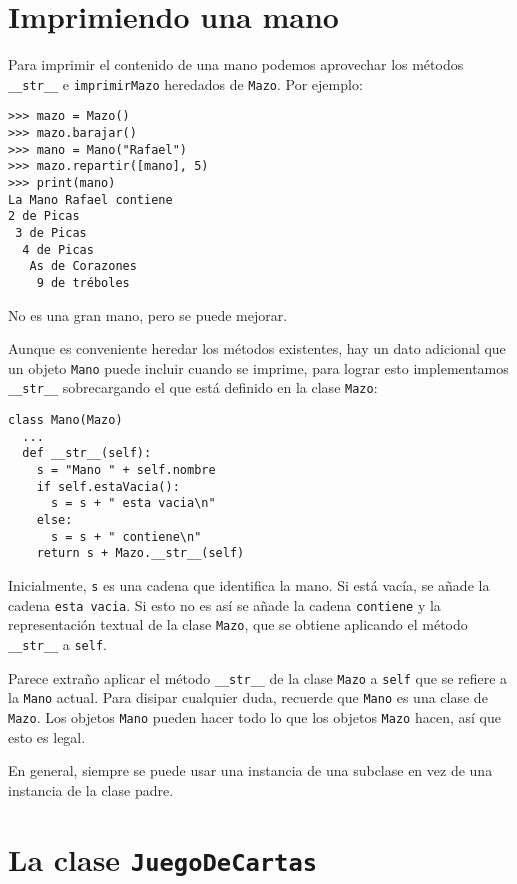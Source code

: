 \section{Imprimiendo una mano}


Para imprimir el contenido de una mano podemos aprovechar los métodos
\texttt{\_\_str\_\_} e \texttt{imprimirMazo} heredados de \texttt{Mazo}.
Por ejemplo:

\begin{verbatim}
>>> mazo = Mazo()
>>> mazo.barajar()
>>> mano = Mano("Rafael")
>>> mazo.repartir([mano], 5)
>>> print(mano)
La Mano Rafael contiene
2 de Picas
 3 de Picas
  4 de Picas
   As de Corazones
    9 de tréboles
\end{verbatim}
 No es una gran mano, pero se puede mejorar.

Aunque es conveniente heredar los métodos existentes, hay un dato
adicional que un objeto \texttt{Mano} puede incluir cuando se imprime,
para lograr esto implementamos \texttt{\_\_str\_\_} sobrecargando
el que está definido en la clase \texttt{Mazo}:

\begin{verbatim}
class Mano(Mazo)
  ...
  def __str__(self):
    s = "Mano " + self.nombre
    if self.estaVacia():
      s = s + " esta vacia\n"
    else:
      s = s + " contiene\n"
    return s + Mazo.__str__(self)
\end{verbatim}
 Inicialmente, \texttt{s} es una cadena que identifica la mano. Si
está vacía, se añade la cadena \texttt{esta vacia}. Si esto no es
así se añade la cadena \texttt{contiene} y la representación textual
de la clase \texttt{Mazo}, que se obtiene aplicando el método \texttt{\_\_str\_\_}
a \texttt{self}.

Parece extraño aplicar el método \texttt{\_\_str\_\_} de la clase
\texttt{Mazo} a \texttt{self} que se refiere a la \texttt{Mano} actual.
Para disipar cualquier duda, recuerde que \texttt{Mano} es una clase
de \texttt{Mazo}. Los objetos \texttt{Mano} pueden hacer todo lo que
los objetos \texttt{Mazo} hacen, así que esto es legal.

  

En general, siempre se puede usar una instancia de una subclase en
vez de una instancia de la clase padre.

\section{La clase \texttt{JuegoDeCartas}}


